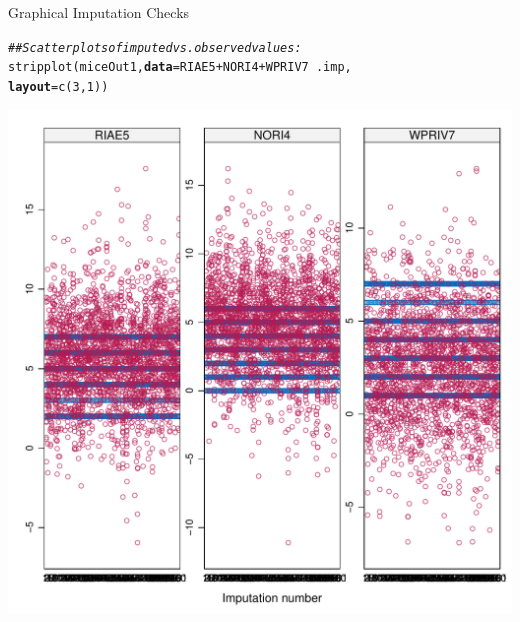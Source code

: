 \documentclass{beamer}\usepackage[]{graphicx}\usepackage[]{color}
\makeatletter
\newcommand{\hlnum}[1]{\textcolor[rgb]{0.69,0.494,0}{#1}}%
\newcommand{\hlcom}[1]{\textcolor[rgb]{0.514,0.506,0.514}{\textit{#1}}}%
\newcommand{\hlopt}[1]{\textcolor[rgb]{0,0,0}{#1}}%
\newcommand{\hlstd}[1]{\textcolor[rgb]{0,0,0}{#1}}%
\newcommand{\hlkwc}[1]{\textcolor[rgb]{0,0,0}{\textbf{#1}}}%
\newcommand{\hlkwd}[1]{\textcolor[rgb]{0.004,0.004,0.506}{#1}}%
\newenvironment{kframe}{%
 \def\at@end@of@kframe{}%
 \ifinner\ifhmode%
  \def\at@end@of@kframe{\end{minipage}}%
  \begin{minipage}{\columnwidth}%
 \fi\fi%
 \def\FrameCommand##1{\hskip\@totalleftmargin \hskip-\fboxsep
 \colorbox{shadecolor}{##1}\hskip-\fboxsep
     \hskip-\linewidth \hskip-\@totalleftmargin \hskip\columnwidth}%
 \MakeFramed {\advance\hsize-\width
   \@totalleftmargin\z@ \linewidth\hsize
   \@setminipage}}%
 {\par\unskip\endMakeFramed%
 \at@end@of@kframe}
\newenvironment{knitrout}{}{} %
\makeatother
\begin{document}
\begin{frame}[fragile]{Graphical Imputation Checks}

\begin{knitrout}\scriptsize
{}\color{fgcolor}\begin{kframe}
\begin{alltt}
\hlcom{## Scatterplots of imputed vs. observed values:}
\hlkwd{stripplot}\hlstd{(miceOut1,} \hlkwc{data} \hlstd{= RIAE5} \hlopt{+} \hlstd{NORI4} \hlopt{+} \hlstd{WPRIV7} \hlopt{~} \hlstd{.imp,}
          \hlkwc{layout} \hlstd{=} \hlkwd{c}\hlstd{(}\hlnum{3}\hlstd{,} \hlnum{1}\hlstd{))}
\end{alltt}
\end{kframe}

{\centering \includegraphics[width=0.65\linewidth,height=0.65\textheight]{figure/unnamed-chunk-12-1} 

}



\end{knitrout}

\end{frame}

\end{document}
